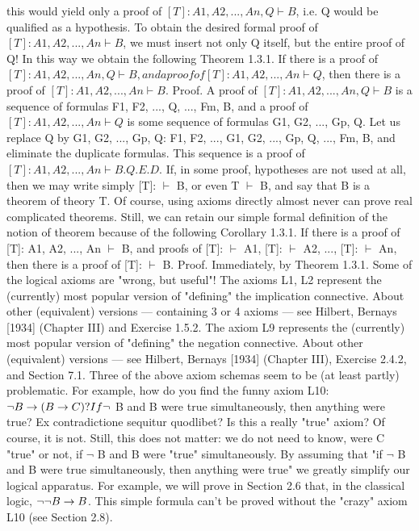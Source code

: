 this would yield only a proof of \([T]: A1, A2, ..., An, Q \vdash B\), i.e. Q would be qualified as a hypothesis. To
obtain the desired formal proof of \([T]: A1, A2, ..., An \vdash B\), we must insert not only Q itself, but the entire
proof of Q! In this way we obtain the following
Theorem 1.3.1. If there is a proof of \([T]: A1, A2, ..., An, Q \vdash B, and a proof of [T]: A1, A2, ..., An \vdash Q\),
then there is a proof of \([T]: A1, A2, ..., An \vdash B\).
Proof. A proof of \([T]: A1, A2, ..., An, Q \vdash B\) is a sequence of formulas F1, F2, ..., Q, ..., Fm, B, and a proof
of \([T]: A1, A2, ..., An \vdash Q\) is some sequence of formulas G1, G2, ..., Gp, Q. Let us replace Q by G1, G2, ...,
Gp, Q:
F1, F2, ..., G1, G2, ..., Gp, Q, ..., Fm, B,
and eliminate the duplicate formulas. This sequence is a proof of \([T]: A1, A2, ..., An \vdash B. Q.E.D.\)
If, in some proof, hypotheses are not used at all, then we may write simply [T]: \(\vdash\) B, or even T \(\vdash\) B, and
say that B is a theorem of theory T. Of course, using axioms directly almost never can prove real
complicated theorems. Still, we can retain our simple formal definition of the notion of theorem because
of the following
Corollary 1.3.1. If there is a proof of [T]: A1, A2, ..., An \(\vdash\) B, and proofs of [T]: \(\vdash\) A1, [T]: \(\vdash\) A2, ..., [T]: \(\vdash\)
An, then there is a proof of [T]: \(\vdash\) B.
Proof. Immediately, by Theorem 1.3.1.
Some of the logical axioms are "wrong, but useful"!
The axioms L1, L2 represent the (currently) most popular version of "defining" the implication
connective. About other (equivalent) versions --- containing 3 or 4 axioms --- see Hilbert, Bernays [1934]
(Chapter III) and Exercise 1.5.2.
The axiom L9 represents the (currently) most popular version of "defining" the negation connective.
About other (equivalent) versions --- see Hilbert, Bernays [1934] (Chapter III), Exercise 2.4.2, and Section
7.1.
Three of the above axiom schemas seem to be (at least partly) problematic.
For example, how do you find the funny axiom L10: \(\neg B\rightarrow (B\rightarrow C)? If \neg\) B and B were true simultaneously,
then anything were true? Ex contradictione sequitur quodlibet? Is this a really "true" axiom? Of course, it
is not. Still, this does not matter: we do not need to know, were C "true" or not, if \(\neg\) B and B were "true"
simultaneously. By assuming that "if \(\neg\) B and B were true simultaneously, then anything were true" we
greatly simplify our logical apparatus. For example, we will prove in Section 2.6 that, in the classical
logic, \(\neg \neg B\rightarrow B\). This simple formula can't be proved without the "crazy" axiom L10 (see Section 2.8).
